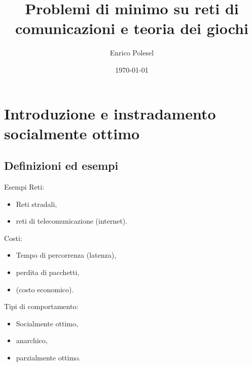 \documentclass{beamer}
\title{Problemi di minimo su reti di comunicazioni e teoria dei giochi}
\date{\today}
\author{Enrico Polesel}
\theoremstyle{plain}
\theoremstyle{definition}
\theoremstyle{remark}
\begin{document}
\maketitle



\section{Introduzione e instradamento socialmente ottimo}

\subsection{Definizioni ed esempi}

\begin{frame}{Esempi}
  Reti:
  \begin{itemize}
  \item Reti stradali,
  \item reti di telecomunicazione (internet).
  \end{itemize}

  Costi:
  \begin{itemize}
  \item Tempo di percorrenza (latenza),
  \item perdita di pacchetti,
  \item (costo economico).
  \end{itemize}

  Tipi di comportamento:
  \begin{itemize}
  \item Socialmente ottimo,
  \item anarchico,
  \item parzialmente ottimo.
  \end{itemize}
\end{frame}
\end{document}
